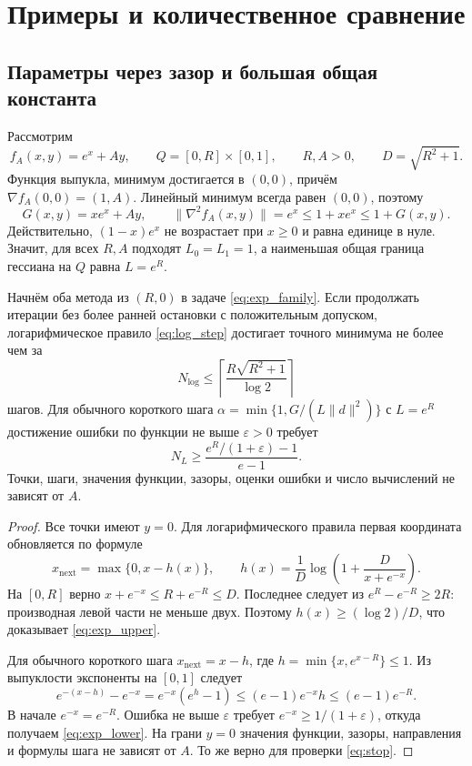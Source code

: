 \section{Примеры и количественное сравнение}\label{sec:examples}
\subsection{Параметры через зазор и большая общая константа}
Рассмотрим
\begin{equation}\label{eq:exp_family}
 f_A(x,y)=e^x+Ay,\qquad
 Q=[0,R]\times[0,1],\qquad R,A>0,\qquad D=\sqrt{R^2+1}.
\end{equation}
Функция выпукла, минимум достигается в $(0,0)$, причём
$\nabla f_A(0,0)=(1,A)$.
Линейный минимум всегда равен $(0,0)$, поэтому
\[
 G(x,y)=xe^x+Ay,\qquad
 \|\nabla^2 f_A(x,y)\|=e^x\le1+xe^x\le1+G(x,y).
\]
Действительно, $(1-x)e^x$ не возрастает при $x\ge0$ и равна единице
в нуле. Значит, для всех $R,A$ подходят $L_0=L_1=1$,
а наименьшая общая граница гессиана на $Q$ равна $L=e^R$.

\begin{theorem}\label{thm:separation}
Начнём оба метода из $(R,0)$ в задаче \eqref{eq:exp_family}.
Если продолжать итерации без более ранней остановки с положительным
допуском, логарифмическое правило \eqref{eq:log_step} достигает точного
минимума не более чем за
\begin{equation}\label{eq:exp_upper}
 N_{\log}\le\left\lceil\frac{R\sqrt{R^2+1}}{\log2}\right\rceil
\end{equation}
шагов. Для обычного короткого шага
$\alpha=\min\{1,G/(L\|d\|^2)\}$ с $L=e^R$
достижение ошибки по функции не выше $\varepsilon>0$ требует
\begin{equation}\label{eq:exp_lower}
 N_L\ge\frac{e^R/(1+\varepsilon)-1}{e-1}.
\end{equation}
Точки, шаги, значения функции, зазоры, оценки ошибки и число
вычислений не зависят от $A$.
\end{theorem}
\begin{proof}
Все точки имеют $y=0$. Для логарифмического правила первая
координата обновляется по формуле
\[
 x_{\mathrm{next}}=\max\{0,x-h(x)\},\qquad
 h(x)=\frac1D\log\left(1+\frac{D}{x+e^{-x}}\right).
\]
На $[0,R]$ верно $x+e^{-x}\le R+e^{-R}\le D$.
Последнее следует из $e^R-e^{-R}\ge2R$: производная левой части
не меньше двух.
Поэтому $h(x)\ge(\log2)/D$, что доказывает \eqref{eq:exp_upper}.

Для обычного короткого шага
$x_{\mathrm{next}}=x-h$, где $h=\min\{x,e^{x-R}\}\le1$.
Из выпуклости экспоненты на $[0,1]$ следует
\[
 e^{-(x-h)}-e^{-x}
 =e^{-x}(e^h-1)
 \le(e-1)e^{-x}h\le(e-1)e^{-R}.
\]
В начале $e^{-x}=e^{-R}$. Ошибка не выше $\varepsilon$ требует
$e^{-x}\ge1/(1+\varepsilon)$, откуда получаем \eqref{eq:exp_lower}.
На грани $y=0$ значения функции, зазоры, направления и формулы
шага не зависят от $A$. То же верно для проверки \eqref{eq:stop}.
\end{proof}

